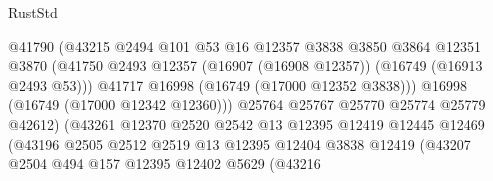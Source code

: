 \begin{lexlean}{RustStd}
\begin{coremodule}
                                        @41790
                                        (@43215
                                          @2494
                                          @101
                                          @53
                                          @16
                                          @12357
                                          @3838
                                          @3850
                                          @3864
                                          @12351
                                          @3870
                                          (@41750
                                            @2493
                                            @12357
                                            (@16907 (@16908 @12357))
                                            (@16749 (@16913 @2493 @53)))
                                          @41717
                                          @16998
                                          (@16749 (@17000 @12352 @3838)))
                                        @16998
                                        (@16749 (@17000 @12342 @12360)))
                                      @25764
                                      @25767
                                      @25770
                                      @25774
                                      @25779
                                      @42612)
                                    (@43261
                                      @12370
                                      @2520
                                      @2542
                                      @13
                                      @12395
                                      @12419
                                      @12445
                                      @12469
                                      (@43196
                                        @2505
                                        @2512
                                        @2519
                                        @13
                                        @12395
                                        @12404
                                        @3838
                                        @12419
                                        (@43207
                                          @2504
                                          @494
                                          @157
                                          @12395
                                          @12402
                                          @5629
                                          (@43216

\end{coremodule}
\end{lexlean}

